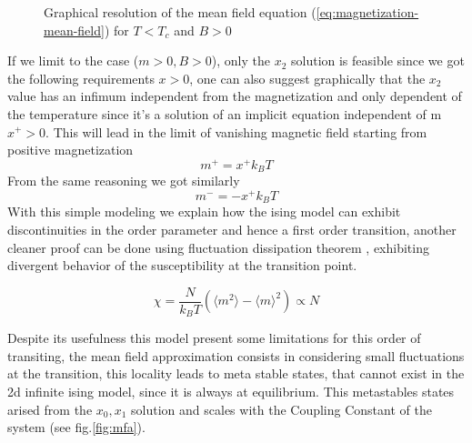 \documentclass[ansiapaper]{report}
\begin{document}
\begin{multicols}{3}
\begin{figure}[H]
\caption{Graphical resolution of the mean field equation (\ref{eq:magnetization-mean-field}) for $T < T_c$ and $B > 0$}
\end{figure}
If we limit to the case ($m>0, B>0$), only the $x_2$ solution is feasible since we got the following requirements $x > 0$, one can also suggest graphically that the $x_2$ value has an infimum independent from the magnetization and only dependent of the temperature since it's a solution of an implicit equation independent of m $x^+ > 0 $. This will lead in the limit of vanishing magnetic field starting from positive magnetization $$m^+ = x^+ k_BT$$ From the same reasoning we got similarly $$m^- = -x^+ k_BT$$ 
With this simple modeling we explain how the ising model can exhibit discontinuities in the order parameter and hence a first order transition, another cleaner proof can be done using fluctuation dissipation theorem \cite{Susceptibility}, exhibiting divergent behavior of the susceptibility at the transition point.

\begin{equation}
    \chi = \frac{N}{k_B T}( \langle m^2 \rangle - \langle m \rangle^2) \propto N
    \label{eq:Finite-sucepbility}
\end{equation}

Despite its usefulness this model present some limitations for this order of transiting, the mean field approximation consists in considering small fluctuations at the transition, this locality leads to meta stable states, that cannot exist in the 2d infinite ising model, since it is always at equilibrium. This metastables states arised from the $x_0, x_1$ solution and scales with the Coupling Constant of the system (see fig.\ref{fig:mfa}).


\end{multicols}
\end{document}
